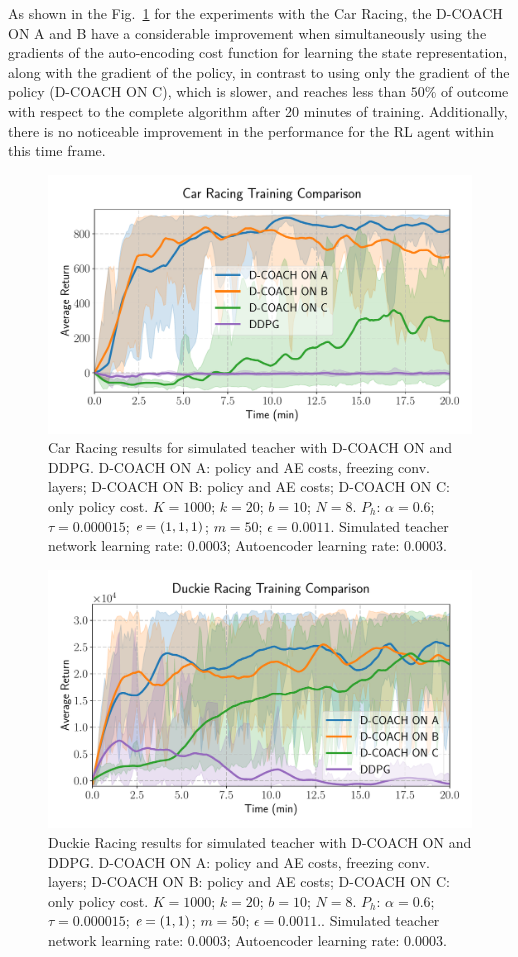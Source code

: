 As shown in the Fig.~\ref{fig:simulatedteachers} for the experiments with the Car Racing, the D-COACH ON A and B have a considerable improvement when simultaneously using the gradients of the auto-encoding cost function for learning the state representation, along with the gradient of the policy, in contrast to using only the gradient of the policy (D-COACH ON C), which is slower, and reaches less than $50\%$ of outcome with respect to the complete algorithm after 20 minutes of training. Additionally, there is no noticeable improvement in the performance for the RL agent within this time frame.

\begin{figure}[h]
    \centering
    \includegraphics[width=0.7\linewidth]{imagenes/cap3/car_racing_sim_ICRA.pdf}
    \caption[Car Racing results for simulated teacher with D-COACH ON and DDPG.]{Car Racing results for simulated teacher with D-COACH ON and DDPG. D-COACH ON A: policy and AE costs, freezing conv. layers; D-COACH ON B: policy and AE costs; D-COACH ON C: only policy cost. $K = 1000$; $k=20$; $b = 10$; $N = 8$. $P_{h}$: $\alpha = 0.6$; $\tau = 0.000015$; $\emph{e}=(1, 1, 1)$; $m=50$; $\epsilon=0.0011$. Simulated teacher network learning rate: $0.0003$; Autoencoder learning rate: $0.0003$.}
    \label{fig:simulatedteachers}
\end{figure}

\begin{figure}[h]
    \centering
    \includegraphics[width=0.7\linewidth]{imagenes/cap3/duckie_sim_ICRA.pdf}
    \caption[Duckie Racing results for simulated teacher with D-COACH ON and DDPG.]{Duckie Racing results for simulated teacher with D-COACH ON and DDPG. D-COACH ON A: policy and AE costs, freezing conv. layers; D-COACH ON B: policy and AE costs; D-COACH ON C: only policy cost. $K = 1000$; $k=20$; $b = 10$; $N = 8$. $P_{h}$: $\alpha = 0.6$; $\tau = 0.000015$; $\emph{e}=(1, 1)$; $m=50$; $\epsilon=0.0011$.. Simulated teacher network learning rate: $0.0003$; Autoencoder learning rate: $0.0003$.}
    \label{fig:racing_car_results}
\end{figure}

